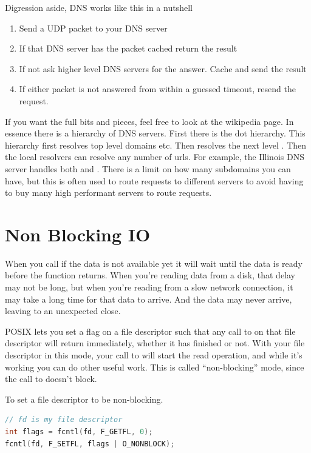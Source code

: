 Digression aside, DNS works like this in a nutshell
\begin{enumerate}
\item Send a UDP packet to your DNS server
\item If that DNS server has the packet cached return the result
\item If not ask higher level DNS servers for the answer. Cache and send the result
  \item If either packet is not answered from within a guessed timeout, resend the request.
\end{enumerate}

If you want the full bits and pieces, feel free to look at the wikipedia page.
In essence there is a hierarchy of DNS servers.
First there is the dot hierarchy.
This hierarchy first resolves top level domains   etc.
Then resolves the next level .
Then the local resolvers can resolve any number of urls.
For example, the Illinois DNS server handles both  and . There is a limit on how many subdomains you can have, but this is often used to route requests to different servers to avoid having to buy many high performant servers to route requests.

\section{Non Blocking IO}

When you call  if the data is not available yet it will wait until the data is ready before the function returns.
When you're reading data from a disk, that delay may not be long, but when you're reading from a slow network connection, it may take a long time for that data to arrive.
And the data may never arrive, leaving to an unexpected close.

POSIX lets you set a flag on a file descriptor such that any call to  on that file descriptor will return immediately, whether it has finished or not.
With your file descriptor in this mode, your call to  will start the read operation, and while it's working you can do other useful work.
This is called ``non-blocking'' mode, since the call to  doesn't block.

To set a file descriptor to be non-blocking.

\begin{lstlisting}[language=C]
// fd is my file descriptor
int flags = fcntl(fd, F_GETFL, 0);
fcntl(fd, F_SETFL, flags | O_NONBLOCK);
\end{lstlisting}

